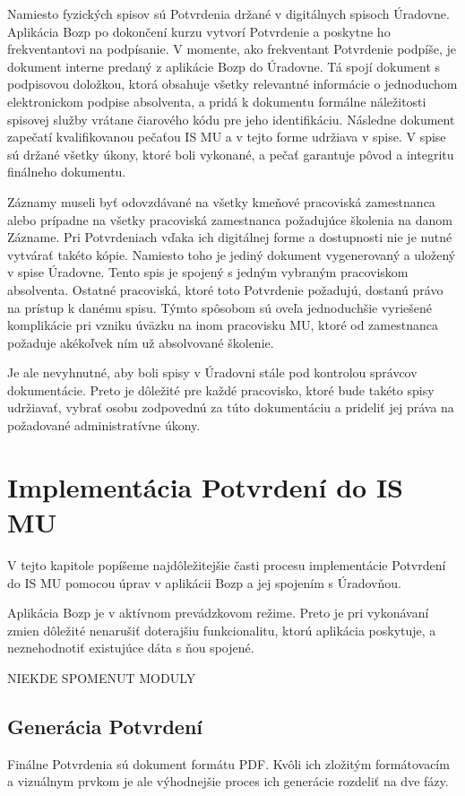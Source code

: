 \documentclass[
  digital,     %
  oneside,     %
  nosansbold,  %
  nocolorbold, %
  lof,         %
  nolot,         %
]{fithesis4}
\begin{document}
Namiesto fyzických spisov sú Potvrdenia držané v digitálnych spisoch Úradovne. Aplikácia Bozp po dokončení kurzu vytvorí Potvrdenie a poskytne ho frekventantovi na podpísanie. V momente, ako frekventant Potvrdenie podpíše, je dokument interne predaný z aplikácie Bozp do Úradovne. Tá spojí dokument s podpisovou doložkou, ktorá obsahuje všetky relevantné informácie o jednoduchom elektronickom podpise absolventa, a pridá k dokumentu formálne náležitosti spisovej služby vrátane čiarového kódu pre jeho identifikáciu. Následne dokument zapečatí kvalifikovanou pečaťou IS MU a v tejto forme udržiava v spise. V spise sú držané všetky úkony, ktoré boli vykonané, a pečať garantuje pôvod a integritu finálneho dokumentu.

Záznamy museli byť odovzdávané na všetky kmeňové pracoviská zamestnanca alebo prípadne na všetky pracoviská zamestnanca požadujúce školenia na danom Zázname. Pri Potvrdeniach vďaka ich digitálnej forme a dostupnosti nie je nutné vytvárať takéto kópie. Namiesto toho je jediný dokument vygenerovaný a uložený v spise Úradovne. Tento spis je spojený s jedným vybraným pracoviskom absolventa. Ostatné pracoviská, ktoré toto Potvrdenie požadujú, dostanú právo na prístup k danému spisu. Týmto spôsobom sú oveľa jednoduchšie vyriešené komplikácie pri vzniku úväzku na inom pracovisku MU, ktoré od zamestnanca požaduje akékoľvek ním už absolvované školenie.

Je ale nevyhnutné, aby boli spisy v Úradovni stále pod kontrolou správcov dokumentácie. Preto je dôležité pre každé pracovisko, ktoré bude takéto spisy udržiavať, vybrať osobu zodpovednú za túto dokumentáciu a prideliť jej práva na požadované administratívne úkony.

\chapter{Implementácia Potvrdení do IS MU}
V tejto kapitole popíšeme najdôležitejšie časti procesu implementácie Potvrdení do IS MU pomocou úprav v aplikácii Bozp a jej spojením s Úradovňou.

Aplikácia Bozp je v aktívnom prevádzkovom režime. Preto je pri vykonávaní zmien dôležité nenarušiť doterajšiu funkcionalitu, ktorú aplikácia poskytuje, a neznehodnotiť existujúce dáta s ňou spojené.

NIEKDE SPOMENUT MODULY

\section{Generácia Potvrdení}
Finálne Potvrdenia sú dokument formátu PDF. Kvôli ich zložitým formátovacím a vizuálnym prvkom je ale výhodnejšie proces ich generácie rozdeliť na dve fázy.
\end{document}
